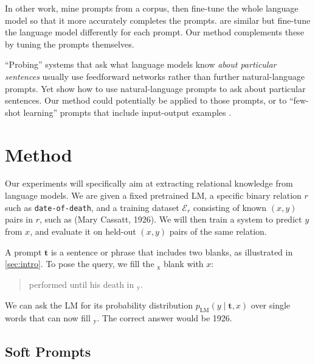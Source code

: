 In other work, \citet{bouraouiInducingRelationalKnowledge2020} mine prompts from a corpus, then fine-tune the whole language model so that it more accurately completes the prompts.  \citet{schick2020exploiting,schick2020s} are similar but fine-tune the language model differently for each prompt.  Our method complements these by tuning the prompts themselves.

``Probing'' systems that ask what language models know \emph{about particular sentences} \cite[e.g.,][]{eichler-etal-2019-linspector} usually use feedforward networks rather than further natural-language prompts.  Yet \citet{shinAutoPromptElicitingKnowledge2020} show how to use natural-language prompts to ask about particular sentences.  Our method could potentially be applied to those prompts, or to ``few-shot learning'' prompts that include input-output examples \cite{brownLanguageModelsAre2020}.

\section{Method}

Our experiments will specifically aim at extracting relational knowledge from language models.  We are given a fixed pretrained LM, a specific binary relation $r$ such as \texttt{date-of-death}, and a training dataset $\mathcal{E}_r$ consisting of known $(x,y)$ pairs in $r$, such as (Mary Cassatt, 1926).  We will then train a system to predict $y$ from $x$, and evaluate it on held-out $(x,y)$ pairs of the same relation.

A prompt $\mathbf{t}$ is a sentence or phrase that includes two blanks, as illustrated in \ref{sec:intro}. To pose the query, we fill the \underline{}$\!_\mathrm{x}$ blank with $x$:

\begin{quote}

  \uline{\phantom{Mary Cassatt}}
   performed until his death in \underline{}$\!_\mathrm{y}$.
\end{quote}

We can ask the LM for its probability distribution $p_\mathrm{LM}(y \mid \mathbf{t}, x)$ over single words that can now fill \underline{}$\!_\mathrm{y}$.  The correct answer would be 1926.

\subsection{Soft Prompts}\label{sec:soft-prompts}

